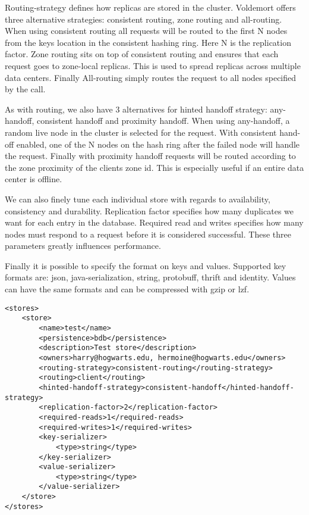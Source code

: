 \begin{itemize}
Routing-strategy defines how replicas are stored in the cluster. Voldemort offers three alternative strategies: consistent routing, zone routing and all-routing. When using consistent routing all requests will be routed to the first N nodes from the keys location in the consistent hashing ring. Here N is the replication factor. Zone routing sits on top of consistent routing and ensures that each request goes to zone-local replicas. This is used to spread replicas across multiple data centers. Finally All-routing simply routes the request to all nodes specified by the call. 

As with routing, we also have 3 alternatives for hinted handoff strategy: any-handoff, consistent handoff and proximity handoff. When using any-handoff, a random live node in the cluster is selected for the request. With consistent hand-off enabled, one of the N nodes on the hash ring after the failed node will handle the request. Finally with proximity handoff requests will be routed according to the zone proximity of the clients zone id. This is especially useful if an entire data center is offline. 

We can also finely tune each individual store with regards to availability, consistency and durability. Replication factor specifies how many duplicates we want for each entry in the database. Required read and writes specifies how many nodes must respond to a request before it is considered successful. These three parameters greatly influences performance. 

Finally it is possible to specify the format on keys and values. Supported key formats are: json, java-serialization, string, protobuff, thrift and identity. Values can have the same formats and can be compressed with gzip or lzf. 

\begin{verbatim}
<stores>
    <store>
        <name>test</name>
        <persistence>bdb</persistence>
        <description>Test store</description>
        <owners>harry@hogwarts.edu, hermoine@hogwarts.edu</owners>
        <routing-strategy>consistent-routing</routing-strategy>
        <routing>client</routing>
        <hinted-handoff-strategy>consistent-handoff</hinted-handoff-strategy>
        <replication-factor>2</replication-factor>
        <required-reads>1</required-reads>
        <required-writes>1</required-writes>
        <key-serializer>
            <type>string</type>
        </key-serializer>
        <value-serializer>
            <type>string</type>
        </value-serializer>
    </store>
</stores>
\end{verbatim}


\end{itemize}
